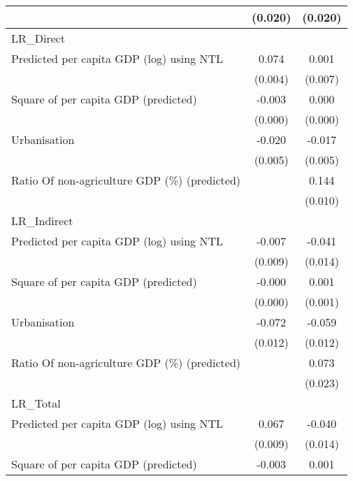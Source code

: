 {\begin{tabular}{l*{2}{c}}
                    &     (0.020)         &     (0.020)         \\
\hline
LR\_Direct           &                     &                     \\
Predicted per capita GDP (log) using NTL&       0.074\sym{***}&       0.001         \\
                    &     (0.004)         &     (0.007)         \\
[1em]
Square of per capita GDP (predicted)&      -0.003\sym{***}&       0.000         \\
                    &     (0.000)         &     (0.000)         \\
[1em]
Urbanisation        &      -0.020\sym{***}&      -0.017\sym{***}\\
                    &     (0.005)         &     (0.005)         \\
[1em]
Ratio Of non-agriculture GDP (\%) (predicted)&                     &       0.144\sym{***}\\
                    &                     &     (0.010)         \\
\hline
LR\_Indirect         &                     &                     \\
Predicted per capita GDP (log) using NTL&      -0.007         &      -0.041\sym{***}\\
                    &     (0.009)         &     (0.014)         \\
[1em]
Square of per capita GDP (predicted)&      -0.000         &       0.001         \\
                    &     (0.000)         &     (0.001)         \\
[1em]
Urbanisation        &      -0.072\sym{***}&      -0.059\sym{***}\\
                    &     (0.012)         &     (0.012)         \\
[1em]
Ratio Of non-agriculture GDP (\%) (predicted)&                     &       0.073\sym{***}\\
                    &                     &     (0.023)         \\
\hline
LR\_Total            &                     &                     \\
Predicted per capita GDP (log) using NTL&       0.067\sym{***}&      -0.040\sym{***}\\
                    &     (0.009)         &     (0.014)         \\
[1em]
Square of per capita GDP (predicted)&      -0.003\sym{***}&       0.001\sym{*}  \\

\end{tabular}}
